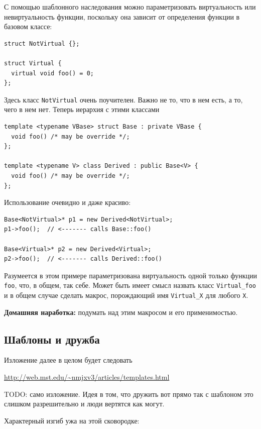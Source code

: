 \documentclass[a4paper,12pt,oneside]{book}
\begin{document}
С помощью шаблонного наследования можно параметризовать виртуальность или невиртуальность функции, поскольку она зависит от определения функции в базовом классе:

\begin{lstlisting}
struct NotVirtual {}; 

struct Virtual {
  virtual void foo() = 0;
};
\end{lstlisting}

Здесь класс \lstinline!NotVirtual! очень поучителен. Важно не то, что в нем есть, а то, чего в нем нет. Теперь иерархия с этими классами

\begin{lstlisting}
template <typename VBase> struct Base : private VBase {  
  void foo() /* may be override */;
};

template <typename V> class Derived : public Base<V> { 
  void foo() /* may be override */;
}; 
\end{lstlisting}

Использование очевидно и даже красиво:

\begin{lstlisting}
Base<NotVirtual>* p1 = new Derived<NotVirtual>; 
p1->foo();  // <------- calls Base::foo() 

Base<Virtual>* p2 = new Derived<Virtual>; 
p2->foo();  // <------- calls Derived::foo() 
\end{lstlisting}

Разумеется в этом примере параметризована виртуальность одной только функции \lstinline!foo!, что, в общем, так себе. Может быть имеет смысл назвать класс \lstinline!Virtual_foo! и в общем случае сделать макрос, порождающий имя \lstinline!Virtual_X! для любого \lstinline!X!.

\textbf{Домашняя наработка:} подумать над этим макросом и его применимостью.

\subsection{Шаблоны и дружба}\label{BartonNackman}

Изложение далее в целом будет следовать 

\url{http://web.mst.edu/~nmjxv3/articles/templates.html}

TODO: само изложение. Идея в том, что дружить вот прямо так с шаблоном это слишком разрешительно и люди вертятся как могут.

Характерный изгиб ужа на этой сковородке:
\end{document}
